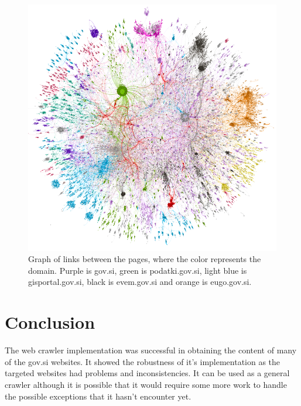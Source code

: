 \documentclass[9pt]{IEEEtran}
\begin{document}
\begin{figure}[ht]
    \centering
    \includegraphics[width=1\columnwidth]{data.png}
    \caption{Graph of links between the pages, where the color represents the domain. Purple is gov.si, green is podatki.gov.si, light blue is gisportal.gov.si, black is evem.gov.si and orange is eugo.gov.si.}
    \label{fig1}
\end{figure}


\section{Conclusion}

The web crawler implementation was successful in obtaining the content of many of the gov.si websites.
It showed the robustness of it's implementation as the targeted websites had problems and inconsistencies.
It can be used as a general crawler although it is possible that it would require some more work to handle the possible exceptions that it hasn't encounter yet.



\end{document}
